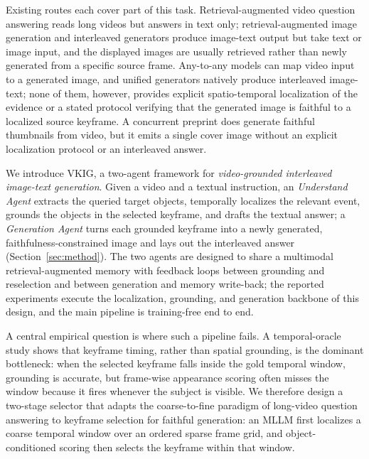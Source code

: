 \documentclass[10pt]{article}
\begin{document}
Existing routes each cover part of this task.
Retrieval-augmented video question answering \citep{videorag2502,videorag2411}
reads long videos but answers in text only; retrieval-augmented image
generation \citep{imagerag2502,orig2510} and interleaved generators
\citep{m2rag2411,m2ior12508} produce image-text output but take text or image
input, and the displayed images are usually retrieved rather than newly
generated from a specific source frame.
Any-to-any models \citep{xvila2405,nextgpt2309} can map video input to a
generated image, and unified generators \citep{emu352510,showo22506} natively
produce interleaved image-text; none of them, however, provides explicit
spatio-temporal localization of the evidence or a stated protocol verifying
that the generated image is faithful to a localized source keyframe.
A concurrent preprint \citep{pvtg2607} does generate faithful thumbnails from
video, but it emits a single cover image without an explicit localization
protocol or an interleaved answer.

We introduce VKIG, a two-agent framework for \emph{video-grounded interleaved
image-text generation}.
Given a video and a textual instruction, an \emph{Understand Agent} extracts
the queried target objects, temporally localizes the relevant event, grounds
the objects in the selected keyframe, and drafts the textual answer; a
\emph{Generation Agent} turns each grounded keyframe into a newly generated,
faithfulness-constrained image and lays out the interleaved answer
(Section~\ref{sec:method}).
The two agents are designed to share a multimodal retrieval-augmented memory
with feedback loops between grounding and reselection and between generation
and memory write-back; the reported experiments execute the localization,
grounding, and generation backbone of this design, and the main pipeline is
training-free end to end.

A central empirical question is where such a pipeline fails.
A temporal-oracle study shows that keyframe timing, rather than spatial
grounding, is the dominant bottleneck: when the selected keyframe falls
inside the gold temporal window, grounding is accurate, but frame-wise
appearance scoring often misses the window because it fires whenever the
subject is visible.
We therefore design a two-stage selector that adapts the coarse-to-fine
paradigm of long-video question answering \citep{unitime2506,focus2510} to
keyframe selection for faithful generation: an MLLM first localizes a coarse
temporal window over an ordered sparse frame grid, and object-conditioned
scoring then selects the keyframe within that window.
\end{document}
